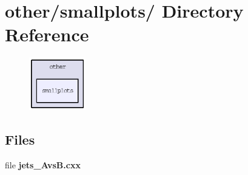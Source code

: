 \section{other/smallplots/ Directory Reference}
\label{dir_003fc4fd0d2fb4c7ae069c1098eeac3f}


\begin{figure}[H]
\begin{center}
\leavevmode
\includegraphics[width=70pt]{dir_003fc4fd0d2fb4c7ae069c1098eeac3f_dep}
\end{center}
\end{figure}
\subsection*{Files}
\begin{CompactItemize}
\item 
file \textbf{jets\_\-Avs\-B.cxx}
\end{CompactItemize}
